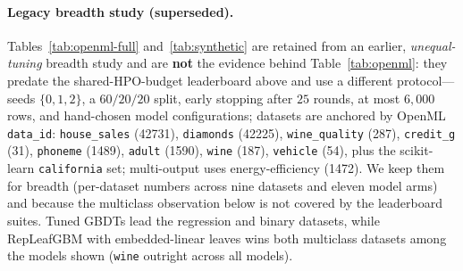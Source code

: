 \documentclass[11pt]{article}
\begin{document}
\paragraph{Legacy breadth study (superseded).}
Tables~\ref{tab:openml-full} and~\ref{tab:synthetic} are retained from an earlier,
\emph{unequal-tuning} breadth study and are \textbf{not} the evidence behind
Table~\ref{tab:openml}: they predate the shared-HPO-budget leaderboard above and use a
different protocol---seeds $\{0,1,2\}$, a $60/20/20$ split, early stopping after $25$
rounds, at most $6{,}000$ rows, and hand-chosen model configurations; datasets are
anchored by OpenML \texttt{data\_id}: \texttt{house\_sales} (42731), \texttt{diamonds}
(42225), \texttt{wine\_quality} (287), \texttt{credit\_g} (31), \texttt{phoneme} (1489),
\texttt{adult} (1590), \texttt{wine} (187), \texttt{vehicle} (54), plus the scikit-learn
\texttt{california} set; multi-output uses energy-efficiency (1472). We keep them for
breadth (per-dataset numbers across nine datasets and eleven model arms) and because the
multiclass observation below is not covered by the leaderboard suites. Tuned GBDTs lead
the regression and binary datasets, while RepLeafGBM with embedded-linear leaves wins both
multiclass datasets among the models shown (\texttt{wine} outright across all models).
\end{document}
